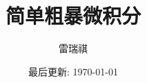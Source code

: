 \documentclass[a4paper,12pt]{article}
\begin{document}
\begin{CJK*}{UTF8}{gbsn}

\author{雷瑞祺}
\title{简单粗暴微积分}
\date{最后更新: \today}

\maketitle
\tableofcontents




\end{CJK*}
\end{document}
